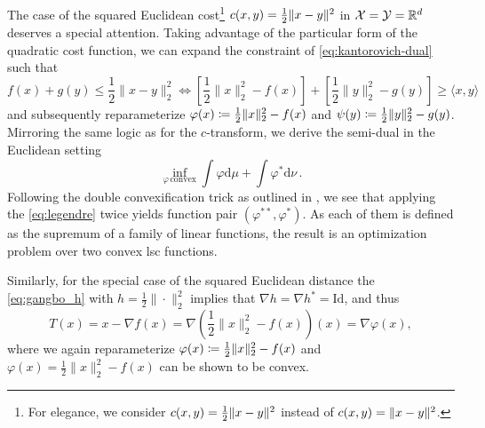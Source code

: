 The case of the squared Euclidean cost\footnote{For elegance, we consider $c(x, y) = \frac{1}{2}\lVert x-y\rVert^2$ instead of $c(x, y) = \lVert x-y\rVert^2$.} $c(x, y) = \frac{1}{2}\lVert x-y\rVert^2$ in ${\mathcal{X}} = {\mathcal{Y}} = \mathbb{R}^d$ deserves a special attention. 
Taking advantage of the particular form of the quadratic cost function, we can expand the constraint of \eqref{eq:kantorovich-dual} such that 
\begin{equation*}
	f(x)+g(y) \leq \frac{1}{2}\|x-y\|_2^2 \Longleftrightarrow  {\left[\frac{1}{2}\|x\|_2^2-f(x)\right]+\left[\frac{1}{2}\|y\|_2^2-g(y)\right] \geq\langle x, y\rangle}
\end{equation*}
and subsequently reparameterize $\varphi(x) \coloneqq \frac{1}{2}\|x\|_2^2-f(x)$ and $\psi(y) \coloneqq \frac{1}{2}\|y\|_2^2-g(y)$.
Mirroring the same logic as for the $c$-transform, we derive the semi-dual in the Euclidean setting 
\begin{equation} \label{eq:dual-cvx}
  \inf_{\varphi\, \text{convex}} \int \varphi \textrm{d}\mu + \int \varphi^*\textrm{d}\nu\,.
\end{equation}
Following the double convexification trick as outlined in \citet[Lemma 2.10]{villani2021topics}, we see that applying the \ref{eq:legendre} twice yields function pair $(\varphi^{**},\varphi^{*})$. As each of them is defined as the supremum of a family of linear functions, the result is an optimization problem over two convex \acrlong{lsc} functions.

Similarly, for the special case of the squared Euclidean distance the  \eqref{eq:gangbo_h} with $h=\frac{1}{2}\|\cdot\|_2^2 $ implies that $\nabla h=\nabla h^*=\mathrm{Id}$, and thus
\begin{equation*}
	T(x)=x-\nabla f(x)=\nabla\left(\frac{1}{2}\|x\|^2_2-f(x)\right)(x)=\nabla \varphi(x),
\end{equation*}
where we again reparameterize $\varphi(x) \coloneqq \frac{1}{2}\|x\|^2_2-f(x)$ and $\varphi(x) = \frac{1}{2}\|x\|_2^2-f(x)$ can be shown to be convex.

